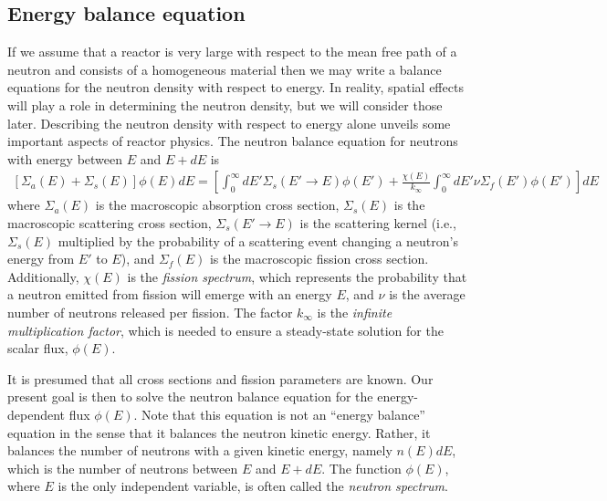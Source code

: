 \documentclass[11pt]{article}
\begin{document}
\subsection{Energy balance equation}
\label{sec:orgheadline28}
If we assume that a reactor is very large with respect to the mean free path of a neutron and consists of a homogeneous material then we may write a balance equations for the neutron density with respect to energy.  In reality, spatial effects will play a role in determining the neutron density, but we will consider those later.  Describing the neutron density with respect to energy alone unveils some important aspects of reactor physics.  The neutron balance equation for neutrons with energy between \(E\) and \(E+dE\) is
\begin{align}
  \left[ \Sigma_a(E) + \Sigma_s(E) \right] \phi(E) dE
  = \left[ \int_0^\infty dE' \Sigma_s(E' \rightarrow E ) \phi(E')
           + \frac{\chi(E)}{k_\infty} \int_0^\infty dE' \nu\Sigma_f(E') \phi(E') \right] dE
\end{align}
where \(\Sigma_a(E)\) is the macroscopic absorption cross section, \(\Sigma_s(E)\) is the macroscopic scattering cross section, \(\Sigma_s(E' \rightarrow E)\) is the scattering kernel (i.e., \(\Sigma_s(E)\) multiplied by the probability of a scattering event changing a neutron's energy from \(E'\) to \(E\)), and \(\Sigma_f(E)\) is the macroscopic fission cross section.  Additionally, \(\chi(E)\) is the \emph{fission spectrum}, which represents the probability that a neutron emitted from fission will emerge with an energy \(E\), and \(\nu\) is the average number of neutrons released per fission.  The factor \(k_\infty\) is the \emph{infinite multiplication factor}, which is needed to ensure a steady-state solution for the scalar flux, \(\phi(E)\).

It is presumed that all cross sections and fission parameters are known.  Our present goal is then to solve the neutron balance equation for the energy-dependent flux \(\phi(E)\).  Note that this equation is not an ``energy balance'' equation in the sense that it balances the neutron kinetic energy.  Rather, it balances the number of neutrons with a given kinetic energy, namely \(n(E)dE\), which is the number of neutrons between \(E\) and \(E+dE\).  The function \(\phi(E)\), where \(E\) is the only independent variable, is often called the \emph{neutron spectrum}.
\end{document}
